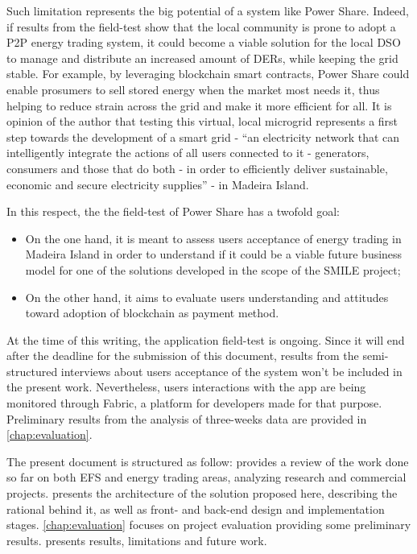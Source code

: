 Such limitation represents the big potential of a system like Power Share. Indeed, if results from the field-test show that the local community is prone to adopt a P2P energy trading system, it could become a viable solution for the local \ac{DSO} to manage and distribute an increased amount of \acp{DER}, while keeping the grid stable. For example, by leveraging blockchain smart contracts, Power Share could enable prosumers to sell stored energy when the market most needs it, thus helping to reduce strain across the grid and make it more efficient for all.
It is opinion of the author that testing this virtual, local microgrid represents a first step towards the development of a smart grid -  “an electricity network that can intelligently integrate the actions of all users connected to it - generators, consumers and those that do both - in order to efficiently deliver sustainable, economic and secure electricity supplies” \cite{OverviewSmartGrid} - in Madeira Island.


In this respect, the the field-test of Power Share has a twofold goal:

\begin{itemize}
    \item On the one hand, it is meant to assess users acceptance of energy trading in Madeira Island in order to understand if it could be a viable future business model  for one of the solutions developed in the scope of the SMILE project;
\item On the other hand, it aims to evaluate users understanding  and attitudes toward adoption of blockchain as  payment method.
\end{itemize}


At the time of this writing, the application field-test is ongoing. Since it will end after the deadline for the submission of this document, results from the semi-structured interviews about users acceptance of the system won’t be included in the present work. Nevertheless, users interactions with the app are being monitored through Fabric, a platform for developers made for that purpose. Preliminary results from the analysis of three-weeks data are provided in \cref{chap:evaluation}.

The present document is structured as follow:  provides a review of the work done so far on both \ac{EFS} and energy trading areas, analyzing research and commercial projects.  presents the architecture of the solution proposed here, describing the rational behind it, as well as front- and back-end design and implementation stages.
\cref{chap:evaluation} focuses on project evaluation providing some preliminary results.  presents results, limitations and future work.


